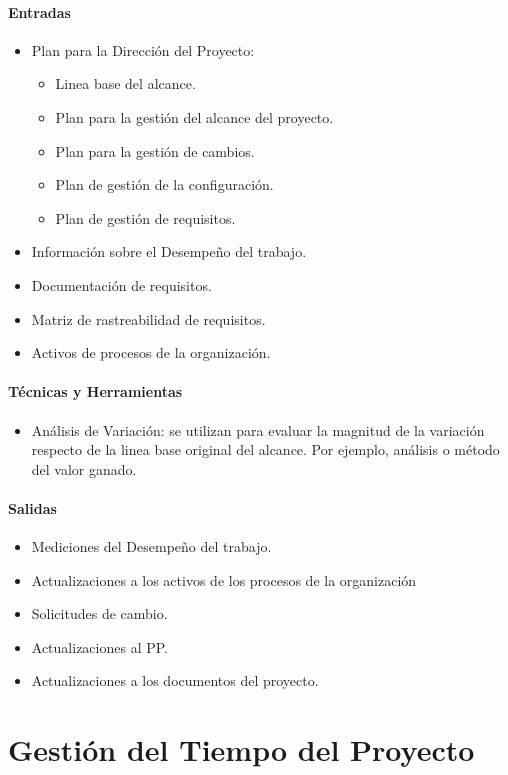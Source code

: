 \documentclass[a4paper,twosides]{article}
\newlength{\wideitemsep}
\let\olditem\item
\renewcommand{\item}{\setlength{\itemsep}{\wideitemsep}\olditem}
\begin{document}
\paragraph{Entradas}
\begin{itemize}
\item Plan para la Dirección del Proyecto:
\begin{itemize}
\item Linea base del alcance.
\item Plan para la gestión del alcance del proyecto.
\item Plan para la gestión de cambios.
\item Plan de gestión de la configuración.
\item Plan de gestión de requisitos.
\end{itemize}
\item Información sobre el Desempeño del trabajo.
\item Documentación de requisitos.
\item Matriz de rastreabilidad de requisitos.
\item Activos de procesos de la organización.
\end{itemize}
\paragraph{Técnicas y Herramientas}
\begin{itemize}
\item Análisis de Variación: se utilizan para evaluar la magnitud de la variación respecto de la linea base original del alcance. Por ejemplo, análisis o método del valor ganado.
\end{itemize}
\paragraph{Salidas}
\begin{itemize}
\item Mediciones del Desempeño del trabajo.
\item Actualizaciones a los activos de los procesos de la organización
\item Solicitudes de cambio.
\item Actualizaciones al PP.
\item Actualizaciones a los documentos del proyecto.
\end{itemize}

\section{Gestión del Tiempo del Proyecto}
\end{document}
